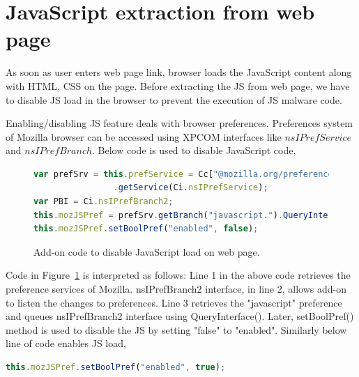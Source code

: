 \section{JavaScript extraction from web page}

As soon as user enters web page link, browser loads the JavaScript content along with HTML, CSS on the page. Before extracting the JS from web page, we have to disable JS load in the browser to prevent the execution of JS malware code.

Enabling/disabling JS feature deals with browser preferences. Preferences system of Mozilla browser can be accessed using XPCOM interfaces like $nsIPrefService$ and $nsIPrefBranch$. Below code is used to disable JavaScript code,

\begin{figure}[h]
  \centering

\begin{lstlisting}[language=JavaScript] 
var prefSrv = this.prefService = Cc["@mozilla.org/preferences-service;1"]
                .getService(Ci.nsIPrefService);
var PBI = Ci.nsIPrefBranch2;
this.mozJSPref = prefSrv.getBranch("javascript.").QueryInterface(PBI);
this.mozJSPref.setBoolPref("enabled", false);
\end{lstlisting}
    \caption[Add-on code to disable JavaScript load on web page]{Add-on code to disable JavaScript load on web page.}
    \label{fig:disablejs}
\end{figure}

Code in Figure~\ref{fig:disablejs} is interpreted as follows: Line 1 in the above code retrieves the preference services of Mozilla. nsIPrefBranch2 interface, in line 2, allows add-on to listen the changes to preferences. Line 3 retrieves the "javascript" preference and queues nsIPrefBranch2 interface using QueryInterface(). Later, setBoolPref() method is used to disable the JS by setting "false" to "enabled". Similarly below line of code enables JS load,
\begin{lstlisting}[language=JavaScript] 
this.mozJSPref.setBoolPref("enabled", true); 
\end{lstlisting}

